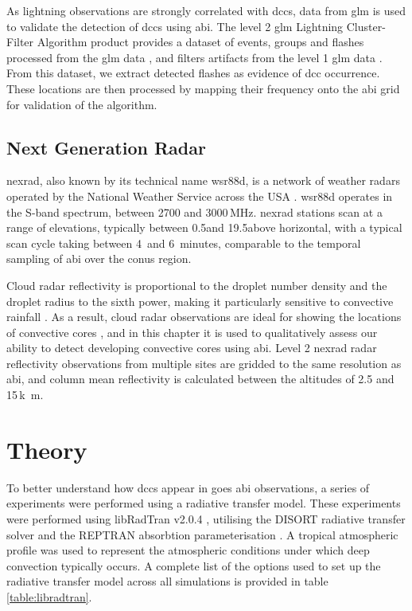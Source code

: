 As lightning observations are strongly correlated with \acrshort{dcc}s, data from \acrshort{glm} is used to validate the detection of \acrshort{dcc}s using \acrshort{abi}.
The level 2 \acrshort{glm} Lightning Cluster-Filter Algorithm product provides a dataset of events, groups and flashes processed from the \acrshort{glm} data \citep{peterson_research_2019}, and filters artifacts from the level 1 \acrshort{glm} data \citep{peterson_removing_2020}.
From this dataset, we extract detected flashes as evidence of \acrshort{dcc} occurrence.
These locations are then processed by mapping their frequency onto the \acrshort{abi} grid for validation of the algorithm.

\subsection{Next Generation Radar}

\acrshort{nexrad}, also known by its technical name \acrshort{wsr88d}, is a network of weather radars operated by the National Weather Service across the USA \citep{crum_wsr-88d_1993}.
\acrshort{wsr88d} operates in the S-band spectrum, between 2700 and 3000\,\unit{MHz}.
\acrshort{nexrad} stations scan at a range of elevations, typically between 0.5\textdegree and 19.5\textdegree above horizontal, with a typical scan cycle taking between 4\, and 6~minutes, comparable to the temporal sampling of \acrshort{abi} over the \acrshort{conus} region.

Cloud radar reflectivity is proportional to the droplet number density and the droplet radius to the sixth power, making it particularly sensitive to convective rainfall \citep{yau_short_1989}.
As a result, cloud radar observations are ideal for showing the locations of convective cores \citep{austin_relation_1987, rosenfeld_general_1993, zipser_vertical_1994}, and in this chapter it is used to qualitatively assess our ability to detect developing convective cores using \acrshort{abi}.
Level 2 \acrshort{nexrad} radar reflectivity observations from multiple sites are gridded to the same resolution as \acrshort{abi}, and column mean reflectivity is calculated between the altitudes of 2.5 and 15\,\unit{k m}.

\section{Theory}

To better understand how \acrshort{dcc}s appear in \acrshort{goes} \acrshort{abi} observations, a series of experiments were performed using a radiative transfer model.
These experiments were performed using libRadTran v2.0.4 \citep{emde_libradtran_2016}, utilising the DISORT radiative transfer solver \citep{buras_new_2011} and the REPTRAN absorbtion parameterisation \citep{gasteiger_representative_2014}.
A tropical atmospheric profile was used to represent the atmospheric conditions under which deep convection typically occurs.
A complete list of the options used to set up the radiative transfer model across all simulations is provided in table \ref{table:libradtran}.

